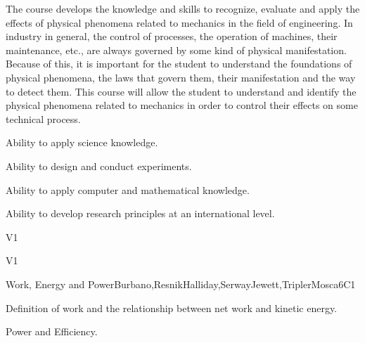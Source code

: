 \begin{syllabus}


\begin{justification}
   The course develops the knowledge and skills to recognize, evaluate and apply the effects of physical phenomena related to mechanics in the field of engineering. In industry in general, the control of processes, the operation of machines, their maintenance, etc., are always governed by some kind of physical manifestation. Because of this, it is important for the student to understand the foundations of physical phenomena, the laws that govern them, their manifestation and the way to detect them. This course will allow the student to understand and identify the physical phenomena related to mechanics in order to control their effects on some technical process. 
\end{justification}

\begin{goals}
\item Ability to apply science knowledge.
\item Ability to design and conduct experiments.
\item Ability to apply computer and mathematical knowledge.
\item Ability to develop research principles at an international level.
\end{goals}

\begin{outcomes}{V1}
  \item {}
  \item {}
  \item {}
\end{outcomes}

\begin{competences}{V1}
  \item {} 
  \item {}
  \item {}
\end{competences}

\begin{unit}{Work, Energy and Power}{}{Burbano,ResnikHalliday,SerwayJewett,TriplerMosca}{6}{C1}
   \begin{topics}
         \item Definition of work and the relationship between net work and kinetic energy.
         \item Power and Efficiency.
      \end{topics}
   

\end{unit}
\end{syllabus}
